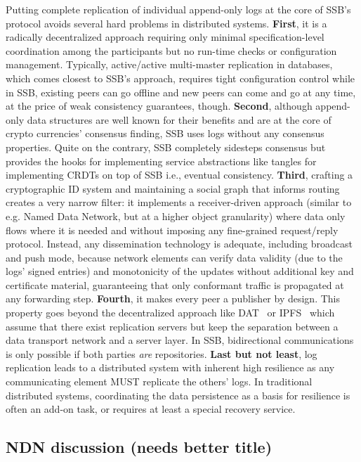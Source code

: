 \documentclass[10pt,sigconf]{acmart}
\begin{document}
Putting complete replication of individual append-only logs at the
core of SSB's protocol avoids several hard problems in distributed
systems. {\bf First}, it is a radically decentralized approach
requiring only minimal specification-level coordination among the
participants but no run-time checks or configuration
management. Typically, active/active multi-master replication in
databases, which comes closest to SSB's approach, requires tight
configuration control while in SSB, existing peers can go offline and
new peers can come and go at any time, at the price of weak
consistency guarantees, though. {\bf Second}, although append-only
data structures are well known for their benefits and are at the core
of crypto currencies' consensus finding, SSB uses logs without any
consensus properties. Quite on the contrary, SSB completely sidesteps
consensus but provides the hooks for implementing service abstractions
like tangles for implementing CRDTs on top of SSB i.e., eventual
consistency. {\bf Third}, crafting a cryptographic ID system and
maintaining a social graph that informs routing creates a very narrow
filter: it implements a receiver-driven approach (similar to
e.g. Named Data Network, but at a higher object granularity) where
data only flows where it is needed and without imposing any
fine-grained request/reply protocol. Instead, any dissemination
technology is adequate, including broadcast and push mode, because
network elements can verify data validity (due to the logs' signed
entries) and monotonicity of the updates without additional key and
certificate material, guaranteeing that only conformant traffic is
propagated at any forwarding step. {\bf Fourth}, it makes every peer a
publisher by design. This property goes beyond the decentralized
approach like DAT~\cite{} or IPFS~\cite{} which assume that there
exist replication servers but keep the separation between a data
transport network and a server layer. In SSB, bidirectional
communications is only possible if both parties {\em are}
repositories. {\bf Last but not least}, log replication leads to a
distributed system with inherent high resilience as any communicating
element MUST replicate the others' logs. In traditional distributed
systems, coordinating the data persistence as a basis for resilience
is often an add-on task, or requires at least a special recovery
service.

\subsection{NDN discussion (needs better title)}
\end{document}

